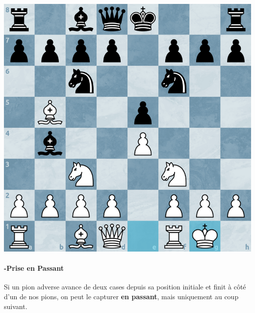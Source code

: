 \documentclass{article}
\begin{document}
\begin{minipage}{0.48\textwidth}
    \centering
    \includegraphics[width=\textwidth, height=\textwidth]{roc2.png}
    \vspace{0.5cm}
\end{minipage}

\paragraph{-Prise en Passant} Si un pion adverse avance de deux cases depuis sa position initiale et finit à côté d'un de nos pions,
 on peut le capturer \textbf{en passant}, mais uniquement au coup suivant.
\end{document}
